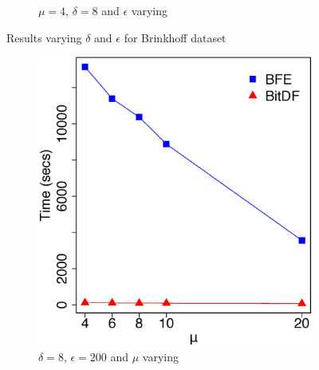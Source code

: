 \begin{figure}[h!]
\begin{subfigure}[t]{0.48\textwidth}
        \caption{$\mu = 4$, $\delta = 8$ and $\epsilon$ varying}
        \label{fig:brinkhoff_vary_g}
    \end{subfigure}
    \caption{Results varying $\delta$ and $\epsilon$ for Brinkhoff dataset}
    \label{fig:brinkhoff_results}
\end{figure}

\begin{figure}[h!]
    \begin{subfigure}[t]{0.48\textwidth}
        \includegraphics[width=\textwidth]{images/Brinkhoff_l_8_g_200_varying_n.eps}
        \caption{$\delta = 8$, $\epsilon = 200$ and $\mu$ varying}
        \label{fig:brinkhoff_vary_n}
    \end{subfigure}
    \begin{subfigure}[t]{0.48\textwidth}

\end{subfigure}
\end{figure}
